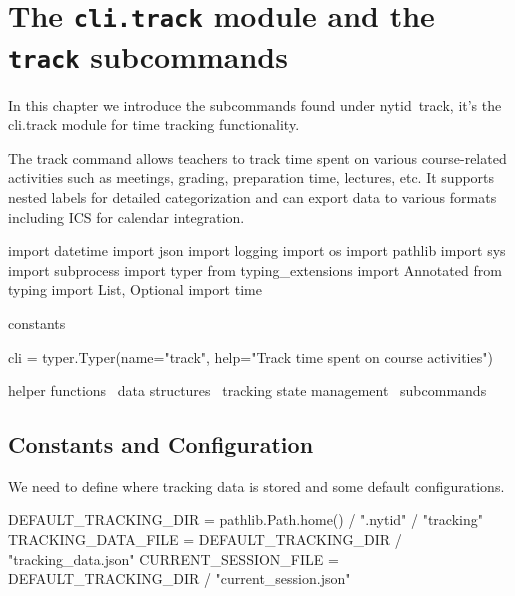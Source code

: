 \chapter{The \texttt{cli.track} module and%
         the \texttt{track} subcommands}%
\label{cli.track}

In this chapter we introduce the subcommands found under {\Tt{}nytid\ track\nwendquote},
it's the {\Tt{}cli.track\nwendquote} module for time tracking functionality.

The track command allows teachers to track time spent on various course-related activities
such as meetings, grading, preparation time, lectures, etc. It supports nested labels for
detailed categorization and can export data to various formats including ICS for calendar integration.

\endmoddef\nwstartdeflinemarkup\nwenddeflinemarkup
import datetime
import json
import logging
import os
import pathlib
import sys
import subprocess
import typer
from typing_extensions import Annotated
from typing import List, Optional
import time


\LA{}constants~{\nwtagstyle{}}\RA{}

cli = typer.Typer(name="track",
                  help="Track time spent on course activities")

\LA{}helper functions~{\nwtagstyle{}}\RA{}
\LA{}data structures~{\nwtagstyle{}}\RA{}
\LA{}tracking state management~{\nwtagstyle{}}\RA{}
\LA{}subcommands~{\nwtagstyle{}}\RA{}
\nwendcode{}\nwdocspar

\section{Constants and Configuration}

We need to define where tracking data is stored and some default configurations.

\nwenddocs{}\endmoddef\nwstartdeflinemarkup{}\nwenddeflinemarkup
DEFAULT_TRACKING_DIR = pathlib.Path.home() / ".nytid" / "tracking"
TRACKING_DATA_FILE = DEFAULT_TRACKING_DIR / "tracking_data.json"
CURRENT_SESSION_FILE = DEFAULT_TRACKING_DIR / "current_session.json"
\nwendcode{}\nwdocspar

